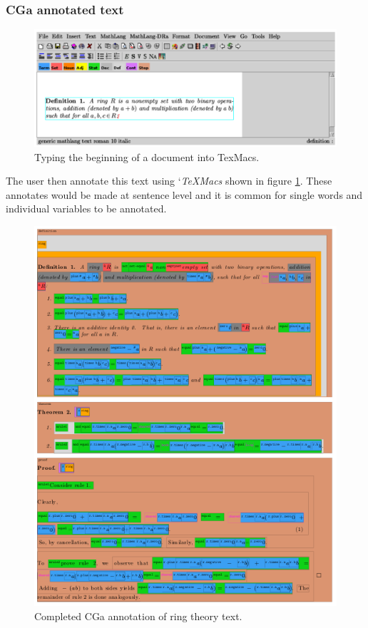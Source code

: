 \subsubsection{CGa annotated text}

\begin{figure}[H]
\begin{center}
\includegraphics[scale=0.4]{Figures/Background/texmacs.png}
\end{center}
\caption{Typing the beginning of a document into TexMacs. \label{fig:texmacs}}
\end{figure}

The user then annotate this text using `\emph{TeXMacs} shown in figure
\ref{fig:texmacs}. These annotates would be made at sentence level and it is
common for single words and individual variables to be annotated.

\begin{figure}[H]
\begin{center}
\includegraphics[scale=0.8]{Figures/Background/ringtheorycga.png}
\end{center}
\caption{Completed CGa annotation of ring theory text. \label{fig:ringcga}}
\end{figure}

